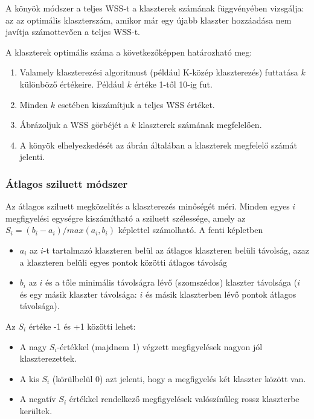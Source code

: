 \documentclass[
  letterpaper,
]{krantz}
\providecommand{\tightlist}{%
  \setlength{\itemsep}{0pt}\setlength{\parskip}{0pt}}\usepackage{longtable,booktabs,array}
\begin{document}
A könyök módszer a teljes WSS-t a klaszterek számának függvényében
vizsgálja: az az optimális klaszterszám, amikor már egy újabb klaszter
hozzáadása nem javítja számottevően a teljes WSS-t.

A klaszterek optimális száma a következőképpen határozható meg:

\begin{enumerate}
\def\labelenumi{\arabic{enumi}.}
\tightlist
\item
  Valamely klaszterezési algoritmust (például K-közép klaszterezés)
  futtatása \(k\) különböző értékeire. Például \(k\) értéke 1-től 10-ig
  fut.
\item
  Minden \(k\) esetében kiszámítjuk a teljes WSS értéket.
\item
  Ábrázoljuk a WSS görbéjét a \(k\) klaszterek számának megfelelően.
\item
  A könyök elhelyezkedését az ábrán általában a klaszterek megfelelő
  számát jelenti.
\end{enumerate}

\hypertarget{uxe1tlagos-sziluett-muxf3dszer}{%
\subsubsection{Átlagos sziluett
módszer}\label{uxe1tlagos-sziluett-muxf3dszer}}

Az átlagos sziluett megközelítés a klaszterezés minőségét méri. Minden
egyes \(i\) megfigyelési egységre kiszámítható a sziluett szélessége,
amely az \(S_i=(b_i−a_i)/max(a_i,b_i)\) képlettel számolható. A fenti
képletben

\begin{itemize}
\tightlist
\item
  \(a_i\) az \(i\)-t tartalmazó klaszteren belül az átlagos klaszteren
  belüli távolság, azaz a klaszteren belüli egyes pontok közötti átlagos
  távolság
\item
  \(b_i\) az \(i\) és a tőle minimális távolságra lévő (szomszédos)
  klaszter távolsága (\(i\) és egy másik klaszter távolsága: \(i\) és
  másik klaszterben lévő pontok átlagos távolsága).
\end{itemize}

Az \(S_i\) értéke -1 és +1 közötti lehet:

\begin{itemize}
\tightlist
\item
  A nagy \(S_i\)-értékkel (majdnem 1) végzett megfigyelések nagyon jól
  klaszterezettek.
\item
  A kis \(S_i\) (körülbelül 0) azt jelenti, hogy a megfigyelés két
  klaszter között van.
\item
  A negatív \(S_i\) értékkel rendelkező megfigyelések valószínűleg rossz
  klaszterbe kerültek.
\end{itemize}
\end{document}
